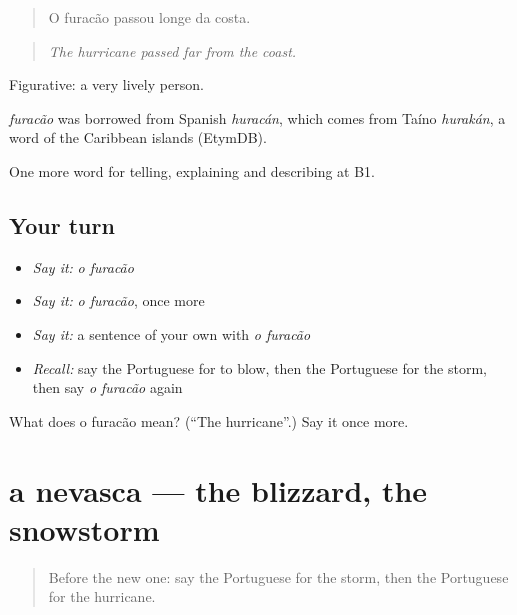\begin{quote}
O furacão passou longe da costa.
\end{quote}

\begin{quote}
\emph{The hurricane passed far from the coast.}
\end{quote}

Figurative: a very lively person.

\begin{cousinweb}
\emph{furacão} was borrowed from Spanish \emph{huracán}, which comes from Taíno \emph{hurakán}, a word of the Caribbean islands (EtymDB).
\end{cousinweb}

\begin{grammarlens}[title={What you've built}]
One more word for telling, explaining and describing at B1.
\end{grammarlens}

\subsection*{Your turn}
\begin{itemize}
\raggedright
  \item \emph{Say it:} \emph{o furacão}
  \item \emph{Say it:} \emph{o furacão}, once more
  \item \emph{Say it:} a sentence of your own with \emph{o furacão}
  \item \emph{Recall:} say the Portuguese for to blow, then the Portuguese for the storm, then say \emph{o furacão} again
\end{itemize}

\begin{tcolorbox}[breakable,colback=teal!4,colframe=teal!35!black,title={Before you move on}]
What does o furacão mean? (\textquotedblleft{}The hurricane\textquotedblright{}.) Say it once more.
\end{tcolorbox}
\section[a nevasca]{a nevasca — the blizzard, the snowstorm}

\label{lesson:PT-C465-nevasca}



\begin{quote}
Before the new one: say the Portuguese for the storm, then the Portuguese for the hurricane.
\end{quote}

